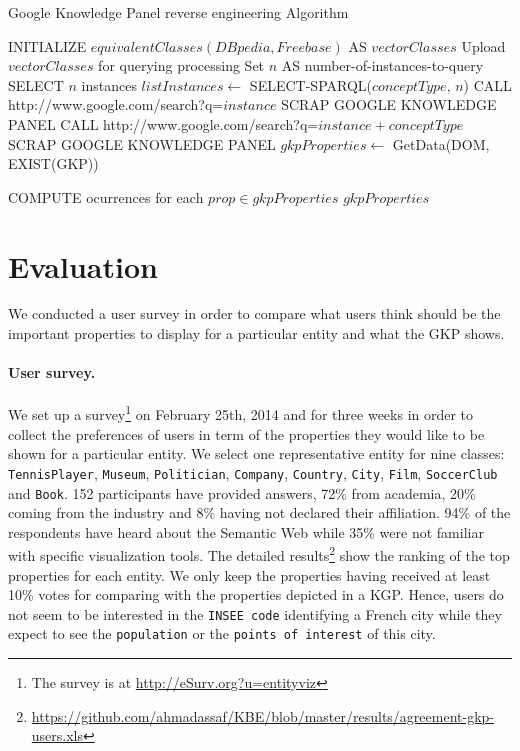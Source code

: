 \documentclass[runningheads,a4paper]{llncs}
\begin{document}
\begin{algorithm}[h]\scriptsize
\caption{Google Knowledge Panel reverse engineering Algorithm} \label{algoscrapping}
\begin{algorithmic}[1]
    \STATE INITIALIZE $equivalentClasses(DBpedia,Freebase) $ AS $vectorClasses$
    \STATE Upload $vectorClasses$ for querying processing
    \STATE Set $n$ AS number-of-instances-to-query
	\STATE SELECT $n$ instances
	\STATE $listInstances \leftarrow$ SELECT-SPARQL($conceptType$, $n$)
			\STATE CALL http://www.google.com/search?q=$instance$
				\STATE SCRAP GOOGLE KNOWLEDGE PANEL
			\ELSE
				\STATE CALL http://www.google.com/search?q=$instance + conceptType$
 				\STATE SCRAP GOOGLE KNOWLEDGE PANEL
			\ENDIF
			\STATE $gkpProperties \leftarrow$ GetData(DOM, EXIST(GKP))

		\ENDFOR
	\STATE COMPUTE ocurrences for each $prop \in gkpProperties$
    \ENDFOR
    \RETURN $gkpProperties$
\end{algorithmic}
\end{algorithm}
\normalsize


\section{Evaluation}
\label{sec:evaluation}
We conducted a user survey in order to compare what users think should be the important properties to display for a particular entity and what the GKP shows.

\paragraph{\textbf{User survey.}}
\label{sec:survey}
We set up a survey\footnote{The survey is at \url{http://eSurv.org?u=entityviz}} on February 25th, 2014 and for three weeks in order to collect the preferences of users in term of the properties they would like to be shown for a particular entity. We select one representative entity for nine classes: \texttt{TennisPlayer}, \texttt{Museum}, \texttt{Politician}, \texttt{Company}, \texttt{Country}, \texttt{City}, \texttt{Film}, \texttt{SoccerClub} and \texttt{Book}. 152 participants have provided answers, 72\% from academia, 20\% coming from the industry and 8\% having not declared their affiliation. 94\% of the respondents have heard about the Semantic Web while 35\% were not familiar with specific visualization tools. The detailed results\footnote{\url{https://github.com/ahmadassaf/KBE/blob/master/results/agreement-gkp-users.xls}} show the ranking of the top properties for each entity. We only keep the properties having received at least 10\% votes for comparing with the properties depicted in a KGP. Hence, users do not seem to be interested in the \texttt{INSEE code} identifying a French city while they expect to see the \texttt{population} or the \texttt{points of interest} of this city.
\end{document}
